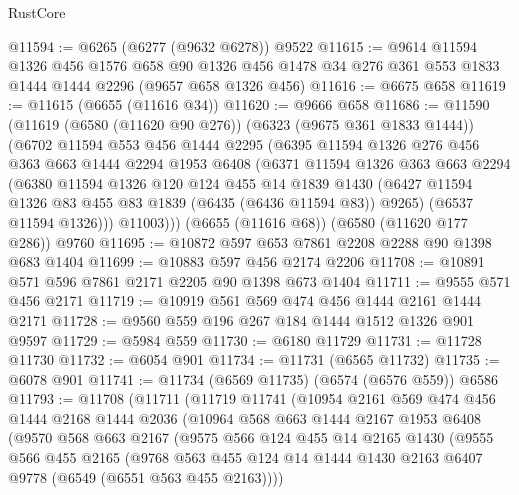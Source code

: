 \begin{lexlean}{RustCore}
\begin{coremodule}
{\begin{coremodule}
{{{{{{{{{{{{{{{{{{{{{{{{{{{{{{{{{{{{{{{{{{{{{@11594 := @6265 (@6277 (@9632 @6278)) @9522
@11615 := @9614
    @11594
    @1326
    @456
    @1576
    @658
    @90
    @1326
    @456
    @1478
    @34
    @276
    @361
    @553
    @1833
    @1444
    @1444
    @2296
    (@9657 @658 @1326 @456)
@11616 := @6675 @658
@11619 := @11615 (@6655 (@11616 @34))
@11620 := @9666 @658
@11686 := @11590
    (@11619
      (@6580 (@11620 @90 @276))
      (@6323 (@9675 @361 @1833 @1444))
      (@6702
        @11594
        @553
        @456
        @1444
        @2295
        (@6395
          @11594
          @1326
          @276
          @456
          @363
          @663
          @1444
          @2294
          @1953
          @6408
          (@6371
            @11594
            @1326
            @363
            @663
            @2294
            (@6380
              @11594
              @1326
              @120
              @124
              @455
              @14
              @1839
              @1430
              (@6427 @11594 @1326 @83 @455 @83 @1839 (@6435 (@6436 @11594 @83)) @9265)
              (@6537 @11594 @1326)))
          @11003)))
    (@6655 (@11616 @68))
    (@6580 (@11620 @177 @286))
    @9760
@11695 := @10872 @597 @653 @7861 @2208 @2288 @90 @1398 @683 @1404
@11699 := @10883 @597 @456 @2174 @2206
@11708 := @10891 @571 @596 @7861 @2171 @2205 @90 @1398 @673 @1404
@11711 := @9555 @571 @456 @2171
@11719 := @10919 @561 @569 @474 @456 @1444 @2161 @1444 @2171
@11728 := @9560 @559 @196 @267 @184 @1444 @1512 @1326 @901 @9597
@11729 := @5984 @559
@11730 := @6180 @11729
@11731 := @11728 @11730
@11732 := @6054 @901
@11734 := @11731 (@6565 @11732)
@11735 := @6078 @901
@11741 := @11734 (@6569 @11735) (@6574 (@6576 @559)) @6586
@11793 := @11708
    (@11711
      (@11719
        @11741
        (@10954
          @2161
          @569
          @474
          @456
          @1444
          @2168
          @1444
          @2036
          (@10964
            @568
            @663
            @1444
            @2167
            @1953
            @6408
            (@9570
              @568
              @663
              @2167
              (@9575
                @566
                @124
                @455
                @14
                @2165
                @1430
                (@9555
                  @566
                  @455
                  @2165
                  (@9768
                    @563
                    @455
                    @124
                    @14
                    @1444
                    @1430
                    @2163
                    @6407
                    @9778
                    (@6549 (@6551 @563 @455 @2163))))
}}}}}}}}}}}}}}}}}}}}}}}}}}}}}}}}}}}}}}}}}}}}}
\end{coremodule}}
\end{coremodule}
\end{lexlean}
